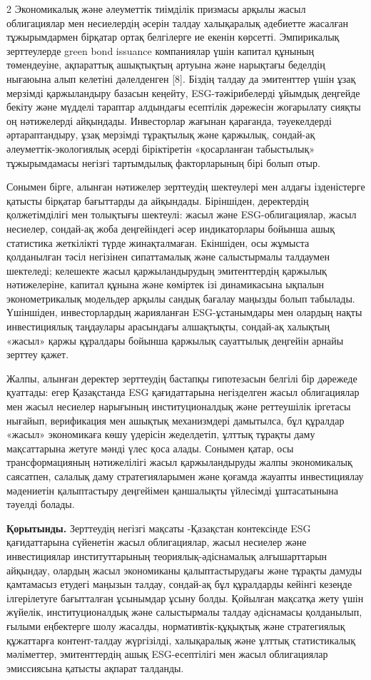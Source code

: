 \begin{multicols}{2}
Экономикалық және әлеуметтік тиімділік призмасы арқылы жасыл
облигациялар мен несиелердің әсерін талдау халықаралық әдебиетте
жасалған тұжырымдармен бірқатар ортақ белгілерге ие екенін көрсетті.
Эмпирикалық зерттеулерде green bond issuance компаниялар үшін капитал
құнының төмендеуіне, ақпараттық ашықтықтың артуына және нарықтағы
беделдің нығаюына алып келетіні дәлелденген {[}8{]}. Біздің талдау да
эмитенттер үшін ұзақ мерзімді қаржыландыру базасын кеңейту,
ESG-тәжірибелерді ұйымдық деңгейде бекіту және мүдделі тараптар
алдындағы есептілік дәрежесін жоғарылату сияқты оң нәтижелерді
айқындады. Инвесторлар жағынан қарағанда, тәуекелдерді әртараптандыру,
ұзақ мерзімді тұрақтылық және қаржылық, сондай-ақ әлеуметтік-экологиялық
әсерді біріктіретін «қосарланған табыстылық» тұжырымдамасы негізгі
тартымдылық факторларының бірі болып отыр.

Сонымен бірге, алынған нәтижелер зерттеудің шектеулері мен алдағы
ізденістерге қатысты бірқатар бағыттарды да айқындады. Біріншіден,
деректердің қолжетімділігі мен толықтығы шектеулі: жасыл және
ESG-облигациялар, жасыл несиелер, сондай-ақ жоба деңгейіндегі әсер
индикаторлары бойынша ашық статистика жеткілікті түрде жинақталмаған.
Екіншіден, осы жұмыста қолданылған тәсіл негізінен сипаттамалық және
салыстырмалы талдаумен шектеледі; келешекте жасыл қаржыландырудың
эмитенттердің қаржылық нәтижелеріне, капитал құнына және көміртек ізі
динамикасына ықпалын эконометрикалық модельдер арқылы сандық бағалау
маңызды болып табылады. Үшіншіден, инвесторлардың жарияланған
ESG-ұстанымдары мен олардың нақты инвестициялық таңдаулары арасындағы
алшақтықты, сондай-ақ халықтың «жасыл» қаржы құралдары бойынша қаржылық
сауаттылық деңгейін арнайы зерттеу қажет.

Жалпы, алынған деректер зерттеудің бастапқы гипотезасын белгілі бір
дәрежеде қуаттады: егер Қазақстанда ESG қағидаттарына негізделген жасыл
облигациялар мен жасыл несиелер нарығының институционалдық және
реттеушілік іргетасы нығайып, верификация мен ашықтық механизмдері
дамытылса, бұл құралдар «жасыл» экономикаға көшу үдерісін жеделдетіп,
ұлттық тұрақты даму мақсаттарына жетуге мәнді үлес қоса алады. Сонымен
қатар, осы трансформацияның нәтижелілігі жасыл қаржыландыруды жалпы
экономикалық саясатпен, салалық даму стратегияларымен және қоғамда
жауапты инвестициялау мәдениетін қалыптастыру деңгейімен қаншалықты
үйлесімді ұштасатынына тәуелді болады.

{\bfseries Қорытынды.} Зерттеудің негізгі мақсаты -Қазақстан контексінде
ESG қағидаттарына сүйенетін жасыл облигациялар, жасыл несиелер және
инвестициялар институттарының теориялық-әдіснамалық алғышарттарын
айқындау, олардың жасыл экономиканы қалыптастырудағы және тұрақты дамуды
қамтамасыз етудегі маңызын талдау, сондай-ақ бұл құралдарды кейінгі
кезеңде ілгерілетуге бағытталған ұсынымдар ұсыну болды. Қойылған
мақсатқа жету үшін жүйелік, институционалдық және салыстырмалы талдау
әдіснамасы қолданылып, ғылыми еңбектерге шолу жасалды,
нормативтік-құқықтық және стратегиялық құжаттарға контент-талдау
жүргізілді, халықаралық және ұлттық статистикалық мәліметтер,
эмитенттердің ашық ESG-есептілігі мен жасыл облигациялар эмиссиясына
қатысты ақпарат талданды.


\end{multicols}
